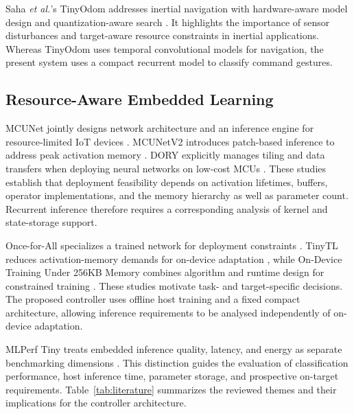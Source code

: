 \documentclass[conference]{IEEEtran}
\begin{document}
Saha \emph{et al.}'s TinyOdom addresses inertial navigation with hardware-aware model design and quantization-aware search \cite{tinyodom}. It highlights the importance of sensor disturbances and target-aware resource constraints in inertial applications. Whereas TinyOdom uses temporal convolutional models for navigation, the present system uses a compact recurrent model to classify command gestures.

\subsection{Resource-Aware Embedded Learning}
MCUNet jointly designs network architecture and an inference engine for resource-limited IoT devices \cite{mcunet}. MCUNetV2 introduces patch-based inference to address peak activation memory \cite{mcunetv2}. DORY explicitly manages tiling and data transfers when deploying neural networks on low-cost MCUs \cite{dory}. These studies establish that deployment feasibility depends on activation lifetimes, buffers, operator implementations, and the memory hierarchy as well as parameter count. Recurrent inference therefore requires a corresponding analysis of kernel and state-storage support.

Once-for-All specializes a trained network for deployment constraints \cite{onceforall}. TinyTL reduces activation-memory demands for on-device adaptation \cite{tinytl}, while On-Device Training Under 256KB Memory combines algorithm and runtime design for constrained training \cite{tinytraining}. These studies motivate task- and target-specific decisions. The proposed controller uses offline host training and a fixed compact architecture, allowing inference requirements to be analysed independently of on-device adaptation.

MLPerf Tiny treats embedded inference quality, latency, and energy as separate benchmarking dimensions \cite{mlperf}. This distinction guides the evaluation of classification performance, host inference time, parameter storage, and prospective on-target requirements. Table~\ref{tab:literature} summarizes the reviewed themes and their implications for the controller architecture.
\end{document}
